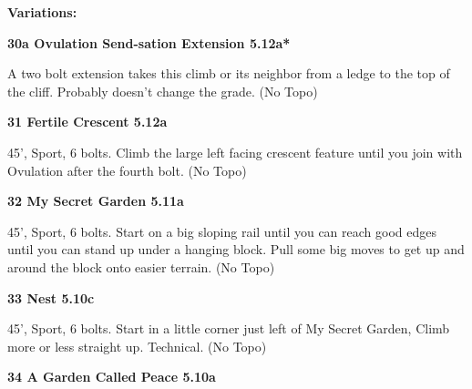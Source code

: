 \begin{multicols}{2}
\begin{adjustwidth}{0.5cm}{}				
\needspace{3cm}
\textbf{Variations:} \newline

\needspace{1.5cm}
\label{vr:Ovulation Send-sation Extension}
\colorbox{Goldenrod!50}{
\parbox{0.95\linewidth}{
\textbf{
30a Ovulation Send-sation Extension 5.12a*  
}}}

\begin{adjustwidth}{0.5cm}{}			
A two bolt extension takes this climb or its neighbor from a ledge to the top of the cliff. Probably doesn't change the grade. (No Topo)
\end{adjustwidth}


\end{adjustwidth}


\needspace{1.5cm}
\label{rt:Fertile Crescent}
\colorbox{Goldenrod!50}{
\parbox{0.95\linewidth}{
\textbf{
31 Fertile Crescent 5.12a  
}}}

\begin{adjustwidth}{0.5cm}{}			
45', Sport, 6 bolts. Climb the large left facing crescent feature until you join with Ovulation after the fourth bolt. (No Topo)
\end{adjustwidth}



\needspace{1.5cm}
\label{rt:My Secret Garden}
\colorbox{RoyalBlue!20}{
\parbox{0.95\linewidth}{
\textbf{
32 My Secret Garden 5.11a  
}}}

\begin{adjustwidth}{0.5cm}{}			
45', Sport, 6 bolts. Start on a big sloping rail until you can reach good edges until you can stand up under a hanging block. Pull some big moves to get up and around the block onto easier terrain. (No Topo)
\end{adjustwidth}



\needspace{1.5cm}
\label{rt:Nest}
\colorbox{RoyalBlue!20}{
\parbox{0.95\linewidth}{
\textbf{
33 Nest 5.10c  
}}}

\begin{adjustwidth}{0.5cm}{}			
45', Sport, 6 bolts. Start in a little corner just left of My Secret Garden, Climb more or less straight up. Technical. (No Topo)
\end{adjustwidth}



\needspace{1.5cm}
\label{rt:A Garden Called Peace}
\colorbox{RoyalBlue!20}{
\parbox{0.95\linewidth}{
\textbf{
34 A Garden Called Peace 5.10a  
}}}


\end{multicols}
